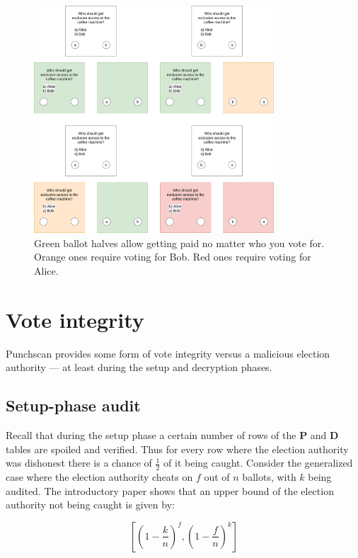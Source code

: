 \begin{figure}
\centering
\includegraphics[width=0.8\textwidth]{../resources/vote_buying_split_highlighted_no_selection.drawio.png}
\caption{Green ballot halves allow getting paid no matter who you vote for. Orange ones require voting for Bob. Red ones require voting for Alice.}
\label{fig:vote_buying}
\end{figure}

\section{Vote integrity}

Punchscan provides some form of vote integrity versus a malicious election
authority --- at least during the setup and decryption phases.

\subsection{Setup-phase audit}

Recall that during the setup phase a certain number of rows of the \textbf{P} and
\textbf{D} tables are spoiled and verified. Thus for every row where the election authority 
was dishonest there is a chance of $\frac{1}{2}$ of it being caught. Consider the
generalized case where the election authority cheats on $f$ out of $n$ ballots,
with $k$ being audited. The introductory paper shows that an upper bound of the
election authority not being caught is given by:

\[
	[(1 - \frac{k}{n})^f, (1 - \frac{f}{n})^k]
\]

